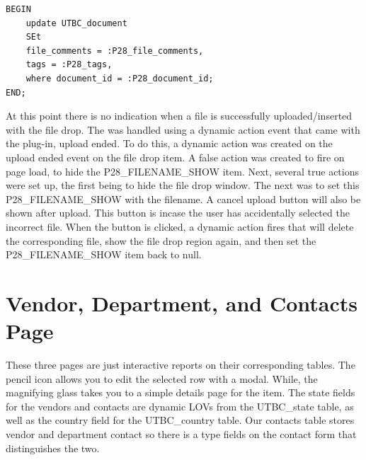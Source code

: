 \documentclass{report}
\begin{document}
\begin{lstlisting}[caption=update statement for filedrop]
BEGIN
	update UTBC_document
	SEt
	file_comments = :P28_file_comments, 
	tags = :P28_tags,
	where document_id = :P28_document_id;
END;
\end{lstlisting}

At this point there is no indication when a file is successfully uploaded/inserted with the file drop. The was handled using a dynamic action event that came with the plug-in, upload ended.  To do this, a dynamic action was created on the upload ended event on the file drop item. A false action was created to fire on page load, to hide the P28\_FILENAME\_SHOW item. Next, several true actions were set up, the first being to hide the file drop window. The next was to set this P28\_FILENAME\_SHOW with the filename. A cancel upload button will also be shown after upload. This button is incase the user has accidentally selected the incorrect file. When the button is clicked, a dynamic action fires that will delete the corresponding file, show the file drop region again, and then set the P28\_FILENAME\_SHOW item back to null.


\section{Vendor, Department, and Contacts Page}
These three pages are just interactive reports on their corresponding tables. The pencil icon allows you to edit the selected row with a modal. While, the magnifying glass takes you to a simple details page for the item. The state fields for the vendors and contacts are dynamic LOVs from the UTBC\_state table, as well as the country field for the UTBC\_country table. Our contacts table stores vendor and department contact so there is a type fields on the contact form that distinguishes the two.
\end{document}
